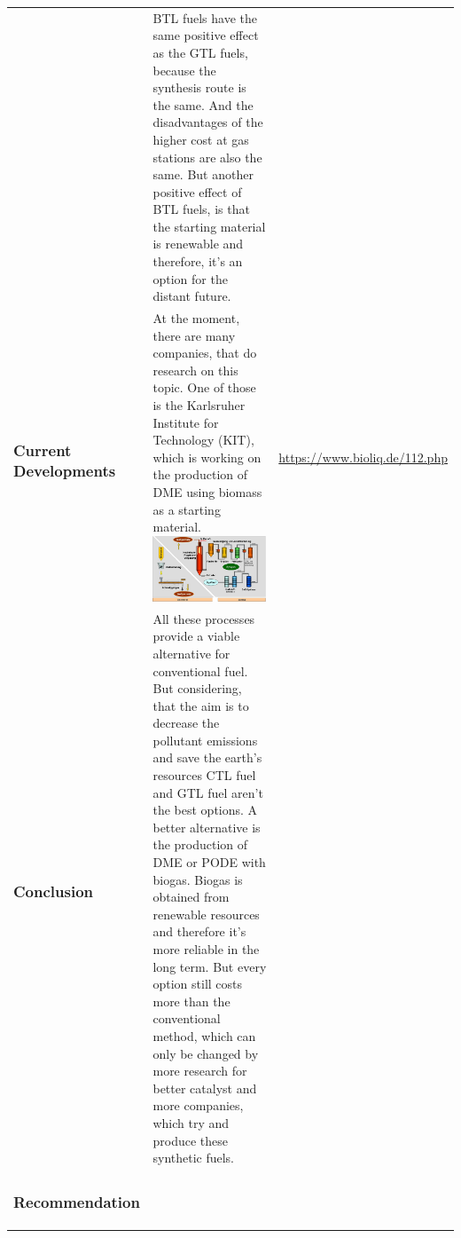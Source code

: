 \begin{xtabular}{|p{3.8cm}|p{8.3cm}|p{4.2cm}|}
 	&
 	BTL fuels have the same positive effect as the GTL fuels, because the synthesis route is the same. And the disadvantages of the higher cost at gas stations are also the same. But another positive effect of BTL fuels, is that the starting material is renewable and therefore, it's an option for the distant future. 
 	&
 	
 	\\
 	\vspace*{-1.25\baselineskip}\subsubsection{Current Developments}
 	& 
 	At the moment, there are many companies, that do research on this topic. One of those is the Karlsruher Institute for Technology (KIT), which is working on the production of DME using biomass as a starting material.
 	{
 		\center
 		\includegraphics[width=8cm]{material/sebastian/img1.png}
 	} 
 	&
 	\url{https://www.bioliq.de/112.php}
 	\\
 	\vspace*{-1.25\baselineskip}\subsubsection{Conclusion}
 	& 
 	All these processes provide a viable alternative for conventional fuel. But considering, that the aim is to decrease the pollutant emissions and save the earth’s resources CTL fuel and GTL fuel aren't the best options. A better alternative is the production of DME or PODE with biogas. Biogas is obtained from renewable resources and therefore it's more reliable in the long term. 
 	But every option still costs more than the conventional method, which can only be changed by more research for better catalyst and more companies, which try and produce these synthetic fuels.
 	&
 	\\
 	\vspace*{-1.25\baselineskip}\subsubsection{Recommendation}

\end{xtabular}

